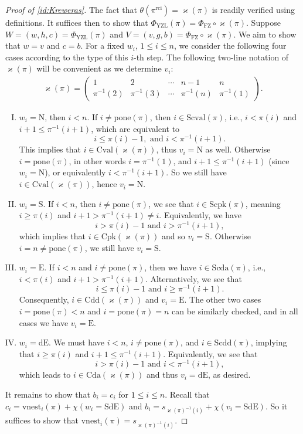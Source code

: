 \documentclass[12pt]{amsart}
\numberwithin{equation}{section}
\theoremstyle{plain}
\theoremstyle{definition}
\def\FZ{\mathrm{FZ}}
\def\YZL{\mathrm{YZL}}
\def\rci{\mathrm{rci}}
\def\N{\mathrm{N}}
\def\S{\mathrm{S}}
\def\E{\mathrm{E}}
\def\dE{\mathrm{dE}}
\def\SdE{\mathrm{SdE}}
\def\Cpk{\mathrm{Cpk}}
\def\Cval{\mathrm{Cval}}
\def\Cda{\mathrm{Cda}}
\def\Cdd{\mathrm{Cdd}}
\def\Scpk{\mathrm{Scpk}}
\def\Scval{\mathrm{Scval}}
\def\Scda{\mathrm{Scda}}
\def\Scdd{\mathrm{Scdd}}
\def\pone{\mathrm{pone}}
\def\vnest{\mathrm{vnest}}
\begin{document}
\begin{proof}[Proof of \eqref{id:Kreweras}]
The fact that $\theta(\pi^{\rci})=\varkappa(\pi)$ is readily verified using definitions. It suffices then to show that $\Phi_{\YZL}(\pi)=\Phi_{\FZ}\circ\varkappa(\pi)$. Suppose $W=(w,h,c)=\Phi_{\YZL}(\pi)$ and $V=(v,g,b)=\Phi_{\FZ}\circ\varkappa(\pi)$. We aim to show that $w=v$ and $c=b$. For a fixed $w_i$, $1\le i\le n$, we consider the following four cases according to the type of this $i$-th step. The following two-line notation of $\varkappa(\pi)$ will be convenient as we determine $v_i$:
\begin{align*}
\varkappa(\pi)=\begin{pmatrix}
1 & 2 & \cdots & n-1 & n\\
\pi^{-1}(2) & \pi^{-1}(3) & \cdots & \pi^{-1}(n) & \pi^{-1}(1)
\end{pmatrix}.
\end{align*}
\begin{enumerate}[(I)]
    \item $w_i=\N$, then $i<n$. If $i\neq \pone(\pi)$, then $i\in\Scval(\pi)$, i.e., $i<\pi(i)$ and $i+1\le \pi^{-1}(i+1)$, which are equivalent to
    $$i\le\pi(i)-1,\text{ and } i<\pi^{-1}(i+1).$$
    This implies that $i\in\Cval(\varkappa(\pi))$, thus $v_i=\N$ as well. Otherwise $i=\pone(\pi)$, in other words $i=\pi^{-1}(1)$, and $i+1\le\pi^{-1}(i+1)$ (since $w_i=\N$), or equivalently $i<\pi^{-1}(i+1)$. So we still have $i\in\Cval(\varkappa(\pi))$, hence $v_i=\N$.
    \item $w_i=\S$. If $i<n$, then $i\neq\pone(\pi)$, we see that $i\in\Scpk(\pi)$, meaning $i\ge\pi(i)$ and $i+1>\pi^{-1}(i+1)\neq i$. Equivalently, we have
    $$i>\pi(i)-1 \text{ and } i>\pi^{-1}(i+1),$$
    which implies that $i\in\Cpk(\varkappa(\pi))$ and so $v_i=\S$. Otherwise $i=n\neq\pone(\pi)$, we still have $v_i=\S$.
    \item $w_i=\E$. If $i<n$ and $i\neq\pone(\pi)$, then we have $i\in\Scda(\pi)$, i.e., $i<\pi(i)$ and $i+1>\pi^{-1}(i+1)$. Alternatively, we see that
    $$i\le\pi(i)-1 \text{ and } i\ge \pi^{-1}(i+1).$$
    Consequently, $i\in\Cdd(\varkappa(\pi))$ and $v_i=\E$. The other two cases $i=\pone(\pi)<n$ and $i=\pone(\pi)=n$ can be similarly checked, and in all cases we have $v_i=\E$.
    \item $w_i=\dE$. We must have $i<n$, $i\neq\pone(\pi)$, and $i\in\Scdd(\pi)$, implying that $i\ge\pi(i)$ and $i+1\le\pi^{-1}(i+1)$. Equivalently, we see that
    $$i>\pi(i)-1 \text{ and } i<\pi^{-1}(i+1),$$
    which leads to $i\in\Cda(\varkappa(\pi))$ and thus $v_i=\dE$, as desired.
\end{enumerate}
It remains to show that $b_i=c_i$ for $1\le i\le n$. Recall that $c_i=\vnest_i(\pi)+\chi(w_i=\SdE)$ and $b_i=s_{\varkappa(\pi)^{-1}(i)}+\chi(v_i=\SdE)$. So it suffices to show that $\vnest_i(\pi)=s_{\varkappa(\pi)^{-1}(i)}$.


\end{proof}
\end{document}
